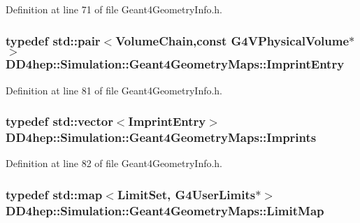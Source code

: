 Definition at line 71 of file Geant4GeometryInfo.h.\hypertarget{namespace_d_d4hep_1_1_simulation_1_1_geant4_geometry_maps_ab7b5bc15fa7417d422647be899d10c88}{
\subsubsection[{ImprintEntry}]{\setlength{\rightskip}{0pt plus 5cm}typedef std::pair$<${\bf VolumeChain},const G4VPhysicalVolume$\ast$$>$ {\bf DD4hep::Simulation::Geant4GeometryMaps::ImprintEntry}}}
\label{namespace_d_d4hep_1_1_simulation_1_1_geant4_geometry_maps_ab7b5bc15fa7417d422647be899d10c88}


Definition at line 81 of file Geant4GeometryInfo.h.\hypertarget{namespace_d_d4hep_1_1_simulation_1_1_geant4_geometry_maps_a44385b9a0b879f5b5a4f11c606cbd968}{
\subsubsection[{Imprints}]{\setlength{\rightskip}{0pt plus 5cm}typedef std::vector$<${\bf ImprintEntry}$>$ {\bf DD4hep::Simulation::Geant4GeometryMaps::Imprints}}}
\label{namespace_d_d4hep_1_1_simulation_1_1_geant4_geometry_maps_a44385b9a0b879f5b5a4f11c606cbd968}


Definition at line 82 of file Geant4GeometryInfo.h.\hypertarget{namespace_d_d4hep_1_1_simulation_1_1_geant4_geometry_maps_a338013d6709b82358b8e2490cdba0ed2}{
\subsubsection[{LimitMap}]{\setlength{\rightskip}{0pt plus 5cm}typedef std::map$<$LimitSet, G4UserLimits$\ast$$>$ {\bf DD4hep::Simulation::Geant4GeometryMaps::LimitMap}}}
\label{namespace_d_d4hep_1_1_simulation_1_1_geant4_geometry_maps_a338013d6709b82358b8e2490cdba0ed2}


